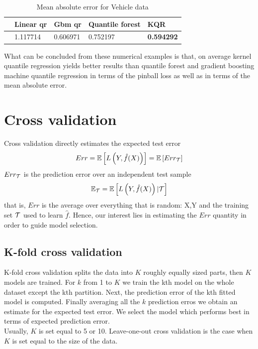 \begin{table}
    \caption{Mean absolute error for Vehicle data}
    \begin{tabular}{lllll}
    \toprule
     & Linear qr & Gbm qr & Quantile forest & KQR \\
    \midrule
     & 1.117714 & 0.606971 & 0.752197 & \textbf{0.594292} \\
    \bottomrule
    \end{tabular}
\end{table}
What can be concluded from these numerical examples is that, on average kernel quantile regression yields better results than quantile forest \cite{meinshausen2006quantile} and gradient boosting machine quantile regression \cite {friedman2001greedy} in terms of the pinball loss as well as in terms of the mean absolute error.



\section{Cross validation}\label{appendix:cross_validation}
Cross validation directly estimates the expected test error
\begin{equation}
    Err=\mathbb{E}\left[L\left(Y,\hat{f}(X)\right)\right]=\mathbb{E}\left[Err_{\mathcal{T}}\right]
\end{equation}
$Err_{\mathcal{T}}$ is the prediction error over an independent test sample
\begin{equation}
    \mathbb{E}_{\mathcal{T}}=\mathbb{E}\left[L\left(Y,\hat{f}(X)\right)| \mathcal{T} \right]
\end{equation}
that is, $Err$ is the average over everything that is random: X,Y and the training set $\mathcal{T}$ used to learn $\hat{f}$. Hence, our interest lies in estimating the $Err$ quantity in order to guide model selection.
\subsection{K-fold cross validation}
K-fold cross validation splits the data into $K$ roughly equally sized parts, then $K$ models are trained. For $k$ from 1 to $K$ we train the kth model on the whole dataset except the kth partition. Next,  the prediction error of the kth fitted model is computed. Finally averaging all the $k$ prediction erros we obtain an estimate for the expected test error. We select the model which performs best in terms of expected prediction error.
\\
Usually, $K$ is set equal to 5 or 10. Leave-one-out cross validation is the case when $K$ is set equal to the size of the data.
